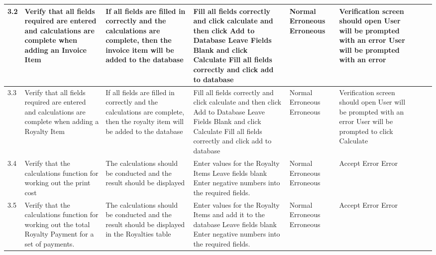 \begin{landscape}
\begin{center}
\begin{longtable}{|p{1.5cm}|p{2cm}|p{2.5cm}|p{2.5cm}|p{2cm}|p{2cm}|p{2cm}|p{2cm}|}
        3.2 & Verify that all fields required are entered and calculations are complete when adding an Invoice Item & If all fields are filled in correctly and the calculations are complete, then the invoice item will be added to the database & Fill all fields correctly and click calculate and then click Add to Database \newline Leave Fields Blank and click Calculate \newline Fill all fields correctly and click add to database & Normal \newline Erroneous \newline Erroneous & Verification screen should open \newline User will be prompted with an error \newline User will be prompted with an error & & \\ \hline
        3.3 & Verify that all fields required are entered and calculations are complete when adding a Royalty Item & If all fields are filled in correctly and the calculations are complete, then the royalty item will be added to the database & Fill all fields correctly and click calculate and then click Add to Database \newline Leave Fields Blank and click Calculate \newline Fill all fields correctly and click add to database & Normal \newline Erroneous \newline Erroneous & Verification screen should open \newline User will be prompted with an error \newline User will be prompted to click Calculate & & \\ \hline
\rowcolor{lightgray} 3.4 & Verify that the calculations function for working out the print cost & The calculations should be conducted and the result should be displayed & Enter values for the Royalty Items \newline Leave fields blank \newline Enter negative numbers into the required fields. & Normal \newline Erroneous \newline Erroneous & Accept \newline Error \newline Error & & \\ \hline 
\rowcolor{lightgray} 3.5 & Verify that the calculations function for working out the total Royalty Payment for a set of payments. & The calculations should be conducted and the result should be displayed in the Royalties table & Enter values for the Royalty Items and add it to the database \newline Leave fields blank \newline Enter negative numbers into the required fields. & Normal \newline Erroneous \newline Erroneous & Accept \newline Error \newline Error & & \\ \hline 

\end{longtable}
\end{center}
\end{landscape}
